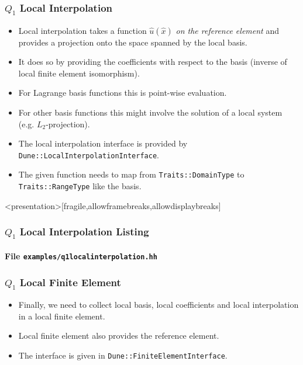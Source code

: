 \begin{frame}
\frametitle{$Q_1$ Local Interpolation}
\begin{itemize}
\item Local interpolation takes a function $\hat{u}(\hat{x})$ \textit{on the
reference element} and provides a projection onto the space spanned by
the local basis.
\item It does so by providing the coefficients with respect to the basis 
(inverse of local finite element isomorphism).
\item For Lagrange basis functions this is point-wise evaluation.
\item For other basis functions this might involve the solution of a local
system (e.g. $L_2$-projection).
\item The local interpolation interface is provided by
\lstinline{Dune::LocalInterpolationInterface}.
\item The given function needs to map from \lstinline{Traits::DomainType}
to \lstinline{Traits::RangeType} like the basis.
\end{itemize}
\end{frame}


\begin{frame}<presentation>[fragile,allowframebreaks,allowdisplaybreaks]
\frametitle<presentation>{$Q_1$ Local Interpolation Listing}
\framesubtitle<presentation>{File \texttt{examples/q1localinterpolation.hh}}

\end{frame}

\begin{frame}
\frametitle{$Q_1$ Local Finite Element}
\begin{itemize}
\item Finally, we need to collect local basis, local coefficients and local
interpolation in a local finite element.

\item Local finite element also provides the reference element.

\item The interface is given
in \lstinline{Dune::FiniteElementInterface}.

\end{itemize}
\end{frame}

